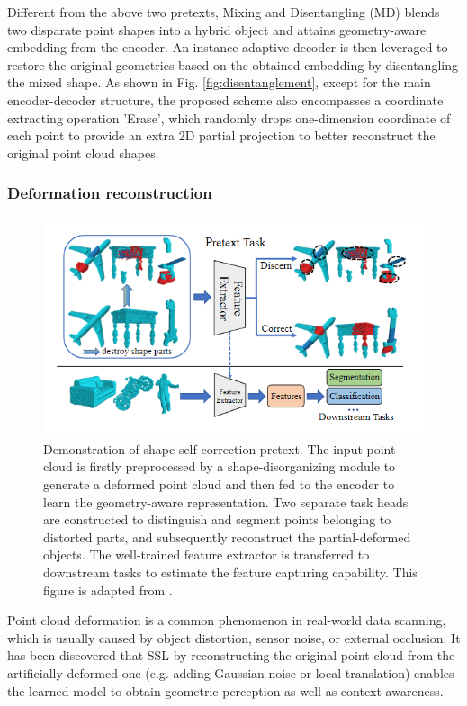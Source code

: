 \documentclass[a4paper,fleqn]{cas-dc}
\begin{document}
Different from the above two pretexts, Mixing and Disentangling (MD) \citep{sun2022self} blends two disparate point shapes into a hybrid object and attains geometry-aware embedding from the encoder. An instance-adaptive decoder is then leveraged to restore the original geometries based on the obtained embedding by disentangling the mixed shape. As shown in Fig. \ref{fig:disentanglement}, except for the main encoder-decoder structure, the proposed scheme also encompasses a coordinate extracting operation 'Erase', which randomly drops one-dimension coordinate of each point to provide an extra 2D partial projection to better reconstruct the original point cloud shapes.


\subsubsection{Deformation reconstruction}

\begin{figure}[htbp]
    \centering
    \includegraphics[width=0.97\linewidth]{self_correction.png}
    \caption{Demonstration of shape self-correction pretext. The input point cloud is firstly preprocessed by a shape-disorganizing module to generate a deformed point cloud and then fed to the encoder to learn the geometry-aware representation. Two separate task heads are constructed to distinguish and segment points belonging to distorted parts, and subsequently reconstruct the partial-deformed objects. The well-trained feature extractor is transferred to downstream tasks to estimate the feature capturing capability. This figure is adapted from \citep{chen2021shape}.}   
    \label{fig:self_correction}
\end{figure}

Point cloud deformation is a common phenomenon in real-world data scanning, which is usually caused by object distortion, sensor noise, or external occlusion. It has been discovered that SSL by reconstructing the original point cloud from the artificially deformed one (e.g. adding Gaussian noise or local translation) enables the learned model to obtain geometric perception as well as context awareness.
\end{document}
